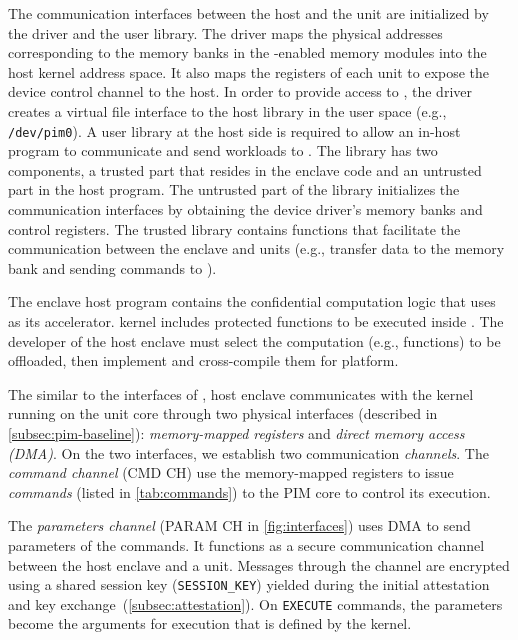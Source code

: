 The communication interfaces between the host and the \thename unit are initialized by the driver and the user library. The driver maps the physical addresses corresponding to the memory banks in the \thename-enabled memory modules into the host kernel address space. It also maps the registers of each \thename unit to expose the device control channel to the host. In order to provide access to \thename, the driver creates a virtual file interface to the host library in the user space (e.g., \texttt{/dev/pim0}). A user library at the host side is required to allow an in-host program to communicate and send workloads to \thename. The \thename library has two components, a trusted part that resides in the enclave code and an untrusted part in the host program. The untrusted part of the library initializes the communication interfaces by obtaining the device driver's memory banks and control registers. The trusted library contains functions that facilitate the communication between the enclave and \thename units (e.g., transfer data to the memory bank and sending commands to \thename).



The enclave host program contains the confidential computation logic that uses \thename as its accelerator. \thename kernel includes protected functions to be executed inside \thename. The developer of the host enclave must select the computation (e.g., functions) to be offloaded, then implement and cross-compile them for \thename platform. 

The similar to the interfaces of \baseline, host enclave communicates with the \thename kernel running on the \thename unit core through two physical interfaces (described in \cref{subsec:pim-baseline}): \emph{memory-mapped registers} and \emph{direct memory access (DMA)}. On the two interfaces, we establish two communication \emph{channels}. The \emph{command channel} (CMD CH) use the memory-mapped registers to issue \emph{commands} (listed in \autoref{tab:commands}) to the PIM core to control its execution.  

The \emph{parameters channel} (PARAM CH in \autoref{fig:interfaces}) uses DMA to send parameters of the commands. It functions as a secure communication channel between the host enclave and a \thename unit. Messages through the channel are encrypted using a shared session key (\texttt{SESSION\_KEY}) yielded during the initial attestation and key exchange~(\cref{subsec:attestation}). On \texttt{EXECUTE} commands, the parameters become the arguments for execution that is defined by the \thename kernel.


